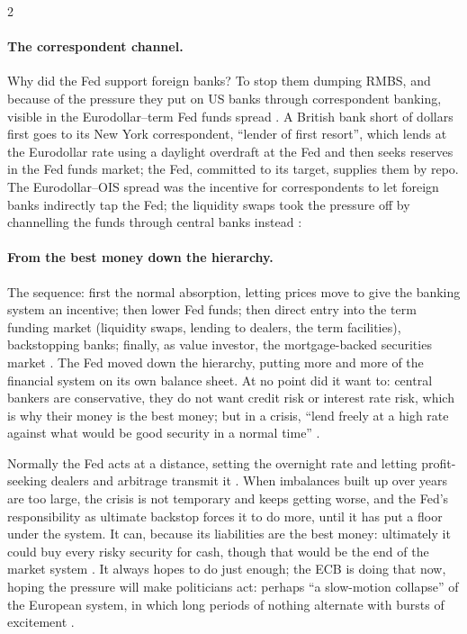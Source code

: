 \begin{paracol}{2}
\paragraph{The correspondent channel.} Why did the Fed support foreign banks? To stop them dumping RMBS, and because of the pressure they put on US banks through correspondent banking, visible
in the Eurodollar--term Fed funds spread . A British bank short of dollars first goes to its New York correspondent, ``lender of first resort'', which lends at the Eurodollar rate
using a daylight overdraft at the Fed and then seeks reserves in the Fed funds market; the Fed, committed to its target, supplies them by repo. The Eurodollar--OIS spread was the incentive
for correspondents to let foreign banks indirectly tap the Fed; the liquidity swaps took the pressure off by channelling the funds through central banks instead :
\begin{taccts}
\quad
{}\quad
{}
\end{taccts}

\paragraph{From the best money down the hierarchy.} The sequence: first the normal absorption, letting prices move to give the banking system an incentive; then lower Fed funds;
then direct entry into the term funding market (liquidity swaps, lending to dealers, the term facilities), backstopping banks; finally, as value investor, the mortgage-backed
securities market . The Fed moved down the hierarchy, putting more and more of the financial system on its own
balance sheet. At no point did it want to: central bankers are conservative, they do not want credit risk or interest rate risk, which is why their money is the best money; but in
a crisis, ``lend freely at a high rate against what would be good security in a normal time'' .

\begin{intuition}
Normally the Fed acts at a distance, setting the overnight rate and letting profit-seeking dealers and arbitrage transmit it . When imbalances built up
over years are too large, the crisis is not temporary and keeps getting worse, and the Fed's responsibility as ultimate backstop forces it to do more, until it has put a floor under
the system. It can, because its liabilities are the best money: ultimately it could buy every risky security for cash, though that would be the end of the market system
. It always hopes to do just enough; the ECB is doing that now, hoping the pressure will make politicians act: perhaps
``a slow-motion collapse'' of the European system, in which long periods of nothing alternate with bursts of excitement .
\end{intuition}


\end{paracol}
